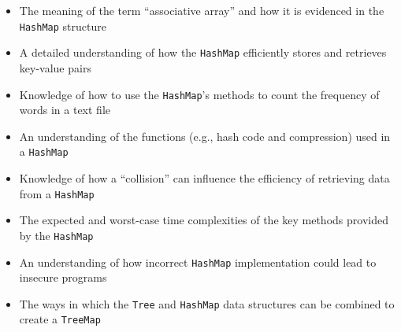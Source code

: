 \documentclass[11pt]{article}
\newcommand{\program}[1]{\lstinline{#1}}
\begin{document}
\begin{itemize}

  \item The meaning of the term ``associative array'' and how it is evidenced in
    the \program{HashMap} structure

  \item A detailed understanding of how the \program{HashMap} efficiently stores and
    retrieves key-value pairs

  \item Knowledge of how to use the \program{HashMap}'s methods to count the
    frequency of words in a text file

  \item An understanding of the functions (e.g., hash code and compression) used
    in a \program{HashMap}

  \item Knowledge of how a ``collision'' can influence the efficiency of
    retrieving data from a \program{HashMap}

  \item The expected and worst-case time complexities of the key methods
    provided by the \program{HashMap}

  \item An understanding of how incorrect \program{HashMap} implementation could
    lead to insecure programs

  \item The ways in which the \program{Tree} and \program{HashMap} data
    structures can be combined to create a \program{TreeMap}

\end{itemize}
\end{document}
